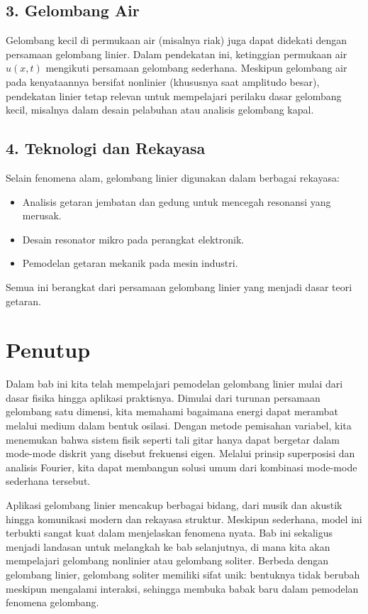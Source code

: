 \documentclass{bukumjh}
\begin{document}
\subsection*{3. Gelombang Air}
Gelombang kecil di permukaan air (misalnya riak) juga dapat didekati dengan persamaan gelombang linier. 
Dalam pendekatan ini, ketinggian permukaan air $u(x,t)$ mengikuti persamaan gelombang sederhana. 
Meskipun gelombang air pada kenyataannya bersifat nonlinier (khususnya saat amplitudo besar), pendekatan linier tetap relevan untuk mempelajari perilaku dasar gelombang kecil, misalnya dalam desain pelabuhan atau analisis gelombang kapal.

\subsection*{4. Teknologi dan Rekayasa}
Selain fenomena alam, gelombang linier digunakan dalam berbagai rekayasa:
\begin{itemize}
  \item Analisis getaran jembatan dan gedung untuk mencegah resonansi yang merusak.
  \item Desain resonator mikro pada perangkat elektronik.
  \item Pemodelan getaran mekanik pada mesin industri.
\end{itemize}
Semua ini berangkat dari persamaan gelombang linier yang menjadi dasar teori getaran.

\section{Penutup}

Dalam bab ini kita telah mempelajari pemodelan gelombang linier mulai dari dasar fisika hingga aplikasi praktisnya. 
Dimulai dari turunan persamaan gelombang satu dimensi, kita memahami bagaimana energi dapat merambat melalui medium dalam bentuk osilasi. 
Dengan metode pemisahan variabel, kita menemukan bahwa sistem fisik seperti tali gitar hanya dapat bergetar dalam mode-mode diskrit yang disebut frekuensi eigen. 
Melalui prinsip superposisi dan analisis Fourier, kita dapat membangun solusi umum dari kombinasi mode-mode sederhana tersebut.

Aplikasi gelombang linier mencakup berbagai bidang, dari musik dan akustik hingga komunikasi modern dan rekayasa struktur. 
Meskipun sederhana, model ini terbukti sangat kuat dalam menjelaskan fenomena nyata. 
Bab ini sekaligus menjadi landasan untuk melangkah ke bab selanjutnya, di mana kita akan mempelajari gelombang nonlinier atau gelombang soliter. 
Berbeda dengan gelombang linier, gelombang soliter memiliki sifat unik: bentuknya tidak berubah meskipun mengalami interaksi, sehingga membuka babak baru dalam pemodelan fenomena gelombang.
\end{document}
